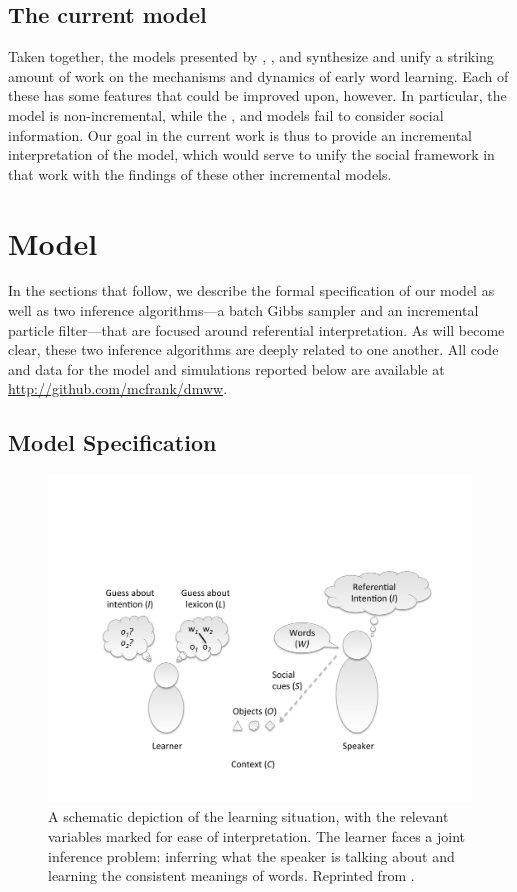 \documentclass[man,noapacite,12pt]{apa2}
\begin{document}
\subsection{The current model}

Taken together, the models presented by , , and  synthesize and unify a striking amount of work on the mechanisms and dynamics of early word learning. Each of these has some features that could be improved upon, however. In particular, the  model is non-incremental, while the , and  models fail to consider social information. Our goal in the current work is thus to provide an incremental interpretation of the  model, which would serve to unify the social framework in that work with the findings of these other incremental models.

\section{Model}


In the sections that follow, we describe the formal specification of our model as well as two inference algorithms---a batch Gibbs sampler and an incremental particle filter---that are focused around referential interpretation. As will become clear, these two inference algorithms are deeply related to one another. All code and data for the model and simulations reported below are available at \url{http://github.com/mcfrank/dmww}. 

\subsection{Model Specification}

\begin{figure}[tr]
\begin{center}
\includegraphics[width=4.5in]{figures/framework_mod.pdf}
\caption{\label{fig:setup} A schematic depiction of the learning situation, with the relevant variables marked for ease of interpretation. The learner faces a joint inference problem: inferring what the speaker is talking about and learning the consistent meanings of words. Reprinted from \protect{}.}
\end{center}
\end{figure}
\end{document}
